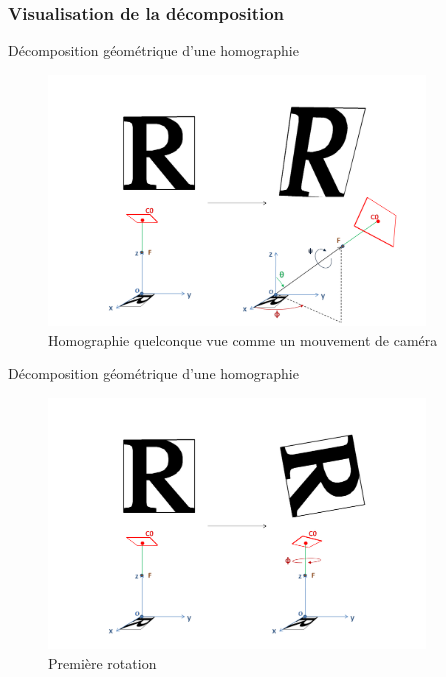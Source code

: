 \documentclass[c,12pt]{beamer}
\begin{document}
  
\subsubsection{Visualisation de la décomposition}

  \begin{frame}{Décomposition géométrique d'une homographie}
  \begin{figure}
   \centering
   \includegraphics[width=100mm]{beamer_decompo_all.png}
   \caption{Homographie quelconque vue comme un mouvement de caméra}
  \end{figure}
  \end{frame}

  \begin{frame}{Décomposition géométrique d'une homographie}
  \begin{figure}
   \centering
   \includegraphics[width=100mm]{beamer_decompo1_rotation_phi.png}
   \caption{Première rotation}
  \end{figure}
  \end{frame}
\end{document}
